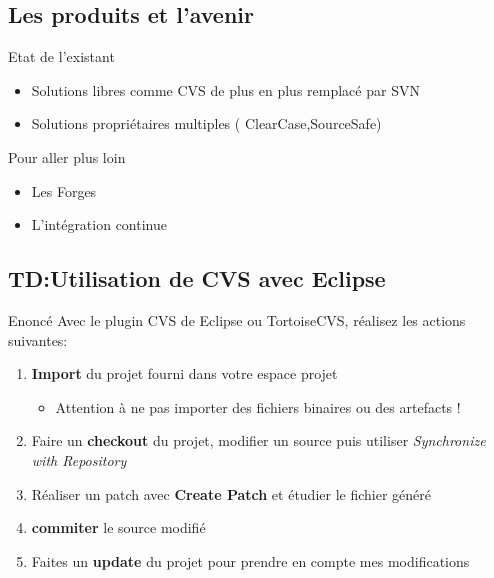 \documentclass[handout]{beamer}
\begin{document}
\subsection{Les produits et l'avenir}
\begin{frame}
	\begin{block}{Etat de l'existant}
		\begin{itemize}
			\item Solutions libres comme CVS de plus en plus remplacé par SVN
			\item Solutions propriétaires multiples ( ClearCase,SourceSafe)
		\end{itemize}
	\end{block}
	\begin{block}{Pour aller plus loin}
		\begin{itemize}
			\item Les Forges
			\item L'intégration continue
		\end{itemize}
	\end{block}
\end{frame}
\subsection{TD:Utilisation de CVS avec Eclipse}
\begin{frame}
	\begin{block}{Enoncé}
		Avec le plugin CVS de Eclipse ou TortoiseCVS, réalisez les actions suivantes:
		\begin{enumerate}
			\item \textbf{Import} du projet fourni dans votre espace projet
			\begin{itemize}
				\item Attention à ne pas importer des fichiers binaires ou des artefacts !
			\end{itemize}
			\item Faire un \textbf{checkout} du projet, modifier un source puis utiliser \textit{Synchronize with Repository}
			\item Réaliser un patch avec \textbf{Create Patch} et étudier le fichier généré
			\item \textbf{commiter} le source modifié
			\item Faites un \textbf{update} du projet pour prendre en compte mes modifications
		\end{enumerate}
	\end{block}
\end{frame}
\end{document}
